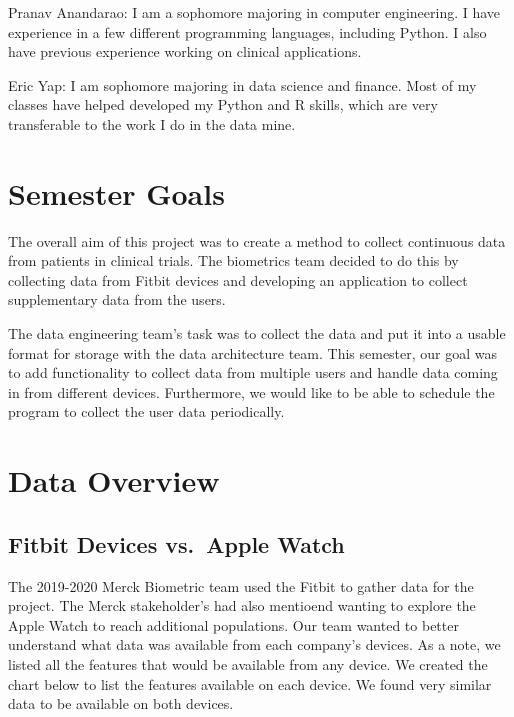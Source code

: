 \documentclass[]{book}
\begin{document}
Pranav Anandarao: I am a sophomore majoring in computer engineering. I
have experience in a few different programming languages, including
Python. I also have previous experience working on clinical
applications.

Eric Yap: I am sophomore majoring in data science and finance. Most of
my classes have helped developed my Python and R skills, which are very
transferable to the work I do in the data mine.

\section{Semester Goals}\label{semester-goals}

The overall aim of this project was to create a method to collect
continuous data from patients in clinical trials. The biometrics team
decided to do this by collecting data from Fitbit devices and developing
an application to collect supplementary data from the users.

The data engineering team's task was to collect the data and put it into
a usable format for storage with the data architecture team. This
semester, our goal was to add functionality to collect data from
multiple users and handle data coming in from different devices.
Furthermore, we would like to be able to schedule the program to collect
the user data periodically.

\section{Data Overview}\label{data-overview}

\subsection{Fitbit Devices vs.~Apple
Watch}\label{fitbit-devices-vs.apple-watch}

The 2019-2020 Merck Biometric team used the Fitbit to gather data for
the project. The Merck stakeholder's had also mentioend wanting to
explore the Apple Watch to reach additional populations. Our team wanted
to better understand what data was available from each company's
devices. As a note, we listed all the features that would be available
from any device. We created the chart below to list the features
available on each device. We found very similar data to be available on
both devices.
\end{document}
